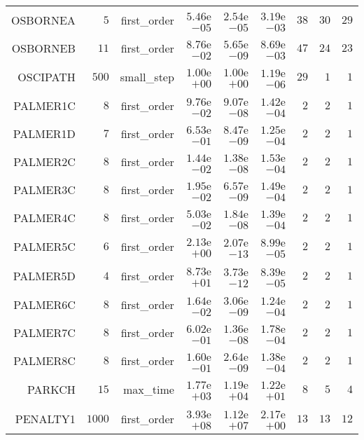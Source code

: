 \begin{longtable}{rrrrrrrrr}
OSBORNEA & \(     5\) & first\_order & \( 5.46\)e\(-05\) & \( 2.54\)e\(-05\) & \( 3.19\)e\(-03\) & \(    38\) & \(    30\) & \(    29\) \\
OSBORNEB & \(    11\) & first\_order & \( 8.76\)e\(-02\) & \( 5.65\)e\(-09\) & \( 8.69\)e\(-03\) & \(    47\) & \(    24\) & \(    23\) \\
OSCIPATH & \(   500\) & small\_step & \( 1.00\)e\(+00\) & \( 1.00\)e\(+00\) & \( 1.19\)e\(-06\) & \(    29\) & \(     1\) & \(     1\) \\
PALMER1C & \(     8\) & first\_order & \( 9.76\)e\(-02\) & \( 9.07\)e\(-08\) & \( 1.42\)e\(-04\) & \(     2\) & \(     2\) & \(     1\) \\
PALMER1D & \(     7\) & first\_order & \( 6.53\)e\(-01\) & \( 8.47\)e\(-09\) & \( 1.25\)e\(-04\) & \(     2\) & \(     2\) & \(     1\) \\
PALMER2C & \(     8\) & first\_order & \( 1.44\)e\(-02\) & \( 1.38\)e\(-08\) & \( 1.53\)e\(-04\) & \(     2\) & \(     2\) & \(     1\) \\
PALMER3C & \(     8\) & first\_order & \( 1.95\)e\(-02\) & \( 6.57\)e\(-09\) & \( 1.49\)e\(-04\) & \(     2\) & \(     2\) & \(     1\) \\
PALMER4C & \(     8\) & first\_order & \( 5.03\)e\(-02\) & \( 1.84\)e\(-08\) & \( 1.39\)e\(-04\) & \(     2\) & \(     2\) & \(     1\) \\
PALMER5C & \(     6\) & first\_order & \( 2.13\)e\(+00\) & \( 2.07\)e\(-13\) & \( 8.99\)e\(-05\) & \(     2\) & \(     2\) & \(     1\) \\
PALMER5D & \(     4\) & first\_order & \( 8.73\)e\(+01\) & \( 3.73\)e\(-12\) & \( 8.39\)e\(-05\) & \(     2\) & \(     2\) & \(     1\) \\
PALMER6C & \(     8\) & first\_order & \( 1.64\)e\(-02\) & \( 3.06\)e\(-09\) & \( 1.24\)e\(-04\) & \(     2\) & \(     2\) & \(     1\) \\
PALMER7C & \(     8\) & first\_order & \( 6.02\)e\(-01\) & \( 1.36\)e\(-08\) & \( 1.78\)e\(-04\) & \(     2\) & \(     2\) & \(     1\) \\
PALMER8C & \(     8\) & first\_order & \( 1.60\)e\(-01\) & \( 2.64\)e\(-09\) & \( 1.38\)e\(-04\) & \(     2\) & \(     2\) & \(     1\) \\
PARKCH & \(    15\) & max\_time & \( 1.77\)e\(+03\) & \( 1.19\)e\(+04\) & \( 1.22\)e\(+01\) & \(     8\) & \(     5\) & \(     4\) \\
PENALTY1 & \(  1000\) & first\_order & \( 3.93\)e\(+08\) & \( 1.12\)e\(+07\) & \( 2.17\)e\(+00\) & \(    13\) & \(    13\) & \(    12\) \\

\end{longtable}
